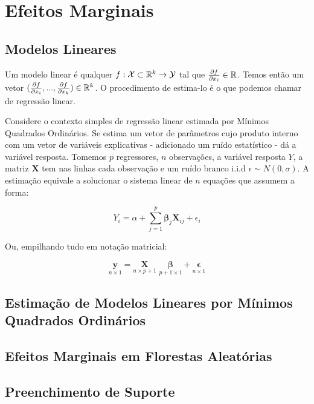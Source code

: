 
\chapter{Efeitos Marginais}

\section{Modelos Lineares}

Um modelo linear é qualquer $f: \mathcal{X} \subset \mathbb{R}^k \to \mathcal{Y}$ tal que $\frac{\partial f}{\partial x_i} \in \mathbb{R}$. Temos então um vetor $(\frac{\partial f}{\partial x_i}, ..., \frac{\partial f}{\partial x_k}) \in \mathbb{R}^k$. O procedimento de estima-lo é o que podemos chamar de regressão linear. 

Considere o contexto simples de regressão linear estimada por Mínimos Quadrados Ordinários. Se estima um vetor de parâmetros cujo produto interno com um vetor de variáveis explicativas - adicionado um ruído estatístico - dá a variável resposta. Tomemos $p$ regressores, $n$ observações, a variável resposta $Y$, a matriz $\mathbf{X}$ tem nas linhas cada observação e um ruído branco i.i.d $\epsilon \sim N(0, \sigma)$. A estimação equivale a solucionar o sistema linear de $n$ equações que assumem a forma:

\begin{equation}
    Y_i = \alpha + \sum_{j = 1}^{p} \boldsymbol{\beta}_j \mathbf{X}_{ij} + \epsilon_i 
\end{equation}

Ou, empilhando tudo em notação matricial:

\begin{equation}
    \underset{n \times 1}{\mathbf{y}} = \underset{n \times p+1}{\mathbf{X}} \,\, \underset{p+1 \times 1}{\boldsymbol{\beta}}   + \underset{n \times 1}{\boldsymbol{\epsilon}}
\end{equation}

\section{Estimação de Modelos Lineares por Mínimos Quadrados Ordinários}

\section{Efeitos Marginais em Florestas Aleatórias}






\section{Preenchimento de Suporte}
